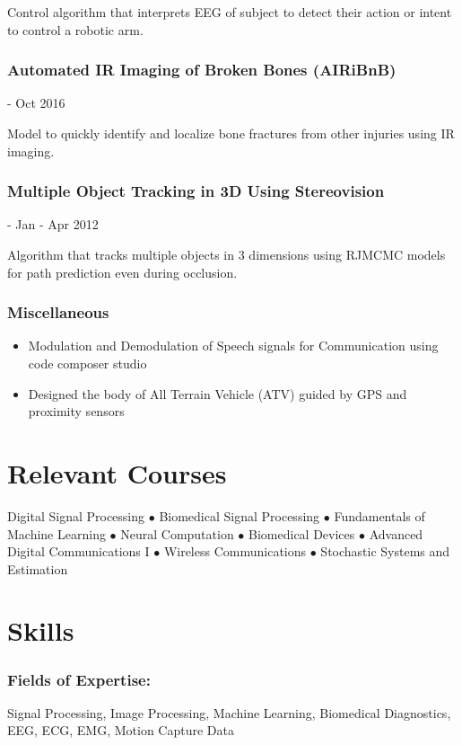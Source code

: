 \documentclass{article}
\begin{document}
Control algorithm that interprets EEG of subject to detect their action or intent to control a robotic arm.

 \subsubsection{Automated IR Imaging of Broken Bones (AIRiBnB)} - Oct 2016
 
Model to quickly identify and localize bone fractures from other injuries using IR imaging.
    
\subsubsection{Multiple Object Tracking in 3D Using Stereovision} - Jan - Apr 2012

Algorithm that tracks multiple objects in 3 dimensions using RJMCMC models for path prediction even during occlusion.
    
\subsubsection{Miscellaneous}
\begin{itemize}
    \item Modulation and Demodulation of Speech signals for Communication using code composer studio 
    \item Designed the body of All Terrain Vehicle (ATV) guided by GPS and proximity sensors  
\end{itemize}


\section{Relevant Courses}
Digital Signal Processing $\bullet$ Biomedical Signal Processing $\bullet$ Fundamentals of Machine Learning $\bullet$ Neural Computation $\bullet$ Biomedical Devices $\bullet$ Advanced Digital Communications I $\bullet$ Wireless Communications $\bullet$ Stochastic Systems and Estimation


\section{Skills}
\subsubsection{Fields of Expertise:} 
Signal Processing, Image Processing, Machine Learning, Biomedical Diagnostics, EEG, ECG, EMG, Motion Capture Data
\end{document}
